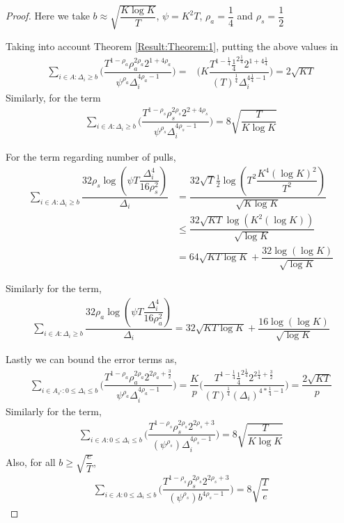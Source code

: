 \begin{proof}
Here we take $b\approx\sqrt{\dfrac{K\log K}{T}}$, $\psi=K^{2}T$, $\rho_{a}=\dfrac{1}{4}$ and $\rho_{s}=\dfrac{1}{2}$
	
	Taking into account Theorem \ref{Result:Theorem:1}, putting the above values in 
	\begin{align*}
	\sum_{i\in A:\Delta_{i}\geq b}\bigg(\dfrac{T^{1-\rho_{a}}\rho_{a}^{2\rho_{a}}2^{1+4\rho_{a}}}{\psi^{\rho_{a}}\Delta_{i}^{4\rho_{a}-1}} \bigg)=& \bigg(K\dfrac{T^{1-\frac{1}{4}}\frac{1}{4}^{2\frac{1}{4}}2^{1+4\frac{1}{4}}}{(T)^{\frac{1}{4}}\Delta_{i}^{4\frac{1}{4}-1}} \bigg)=2\sqrt{KT}
	\end{align*}		
	 Similarly, for the term
	 \begin{align*}
	 \sum_{i\in A:\Delta_{i}\geq b}\bigg(\dfrac{T^{1-\rho_{s}}\rho_{s}^{2\rho_{s}}2^{2+4\rho_{s}}}{\psi^{\rho_{s}}\Delta_{i}^{4\rho_{s}-1}} \bigg) = 8\sqrt{\dfrac{T}{K\log K}}
	 \end{align*}
	 
	
	For the term regarding number of pulls,
	\begin{align*}
	\sum_{i\in A:\Delta_{i}\geq b}\dfrac{32\rho_{s}\log{(\psi T\dfrac{\Delta_{i}^{4}}{16\rho_{s}^{2}})}}{\Delta_{i}} &= \dfrac{32\sqrt{T}\frac{1}{2}\log{(T^{2}\dfrac{K^{4}(\log K)^{2}}{T^{2}})}}{\sqrt{K\log K}}\\
	&\leq  \dfrac{32\sqrt{KT}\log{(K^{2}(\log K))}}{\sqrt{\log K}}\\
	&=64\sqrt{KT\log K} + \dfrac{32\log{(\log K)}}{\sqrt{\log K}}
	\end{align*}		
	
	Similarly for the term,
	\begin{align*}
	\sum_{i\in A:\Delta_{i}\geq b}\dfrac{32\rho_{a}\log{(\psi T\dfrac{\Delta_{i}^{4}}{16\rho_{a}^{2}})}}{\Delta_{i}} = 32\sqrt{KT\log K} + \dfrac{16\log{(\log K)}}{\sqrt{\log K}}
	\end{align*}		
	
 	Lastly we can bound the error terms as, 
	\begin{align*}
	\sum\limits_{i\in A_{s^{*}}:0\leq\Delta_{i}\leq b}\bigg(\dfrac{T^{1-\rho_{a}}\rho_{a}^{2\rho_{a}}2^{2\rho_{a}+\frac{3}{2}}}{\psi^{\rho_{a}}\Delta_{i}^{4\rho_{a}-1}} \bigg)=\dfrac{K}{p}\bigg(\dfrac{T^{1-\frac{1}{4}}\frac{1}{4}^{2\frac{1}{4}}2^{2\frac{1}{4}+\frac{3}{2}}}{{(T)^{\frac{1}{4}}}{(\Delta_{i})^{4*\frac{1}{4}-1}}} \bigg) = \dfrac{2 \sqrt{KT} }{p}
	\end{align*}	 	
 	Similarly for the term,
 	\begin{align*}
 	\sum\limits_{i\in A:0\leq\Delta_{i}\leq b}\bigg(\dfrac{T^{1-\rho_{s}}\rho_{s}^{2\rho_{s}}2^{2\rho_{s}+3}}{(\psi^{\rho_{s}})\Delta_{i}^{4\rho_{s} -1}} \bigg)= 8\sqrt{\dfrac{T}{K\log K}}
	\end{align*} 	
	Also, for all $b\geq \sqrt{\dfrac{e}{T}}$,
	\begin{align*}
 	\sum\limits_{i\in A:0\leq\Delta_{i}\leq b}\bigg(\dfrac{T^{1-\rho_{s}}\rho_{s}^{2\rho_{s}}2^{2\rho_{s}+3}}{(\psi^{\rho_{s}})b^{4\rho_{s} -1}} \bigg)= 8\sqrt{\dfrac{T}{e}}
	\end{align*} 	
 	


\end{proof}
